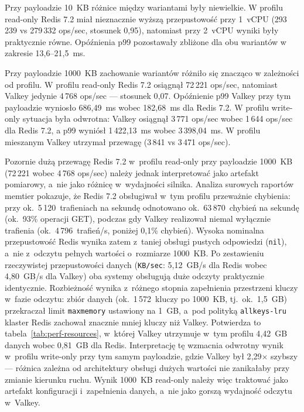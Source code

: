 Przy payloadzie 10~KB różnice między wariantami były niewielkie. W profilu read-only Redis 7.2 miał nieznacznie wyższą przepustowość przy 1~vCPU (293\,239 vs 279\,332 ops/sec, stosunek 0{,}95), natomiast przy 2~vCPU wyniki były praktycznie równe. Opóźnienia p99 pozostawały zbliżone dla obu wariantów w zakresie 13{,}6--21{,}5~ms.

Przy payloadzie 1000~KB zachowanie wariantów różniło się znacząco w zależności od profilu. W profilu read-only Redis 7.2 osiągnął 72\,221 ops/sec, natomiast Valkey jedynie 4\,768 ops/sec --- stosunek 0{,}07. Opóźnienie p99 Valkey przy tym payloadzie wyniosło 686{,}49~ms wobec 182{,}68~ms dla Redis 7.2. W profilu write-only sytuacja była odwrotna: Valkey osiągnął 3\,771 ops/sec wobec 1\,644 ops/sec dla Redis 7.2, a p99 wyniósł 1\,422{,}13~ms wobec 3\,398{,}04~ms. W profilu mieszanym Valkey utrzymał przewagę (3\,841 vs 3\,471 ops/sec).

Pozornie dużą przewagę Redis 7.2 w~profilu read-only przy payloadzie 1000~KB (72\,221 wobec 4\,768 ops/sec) należy jednak interpretować jako artefakt pomiarowy, a~nie jako różnicę w~wydajności silnika. Analiza surowych raportów memtier pokazuje, że Redis 7.2 obsługiwał w~tym profilu przeważnie chybienia: przy ok.\ 5\,120~trafieniach na sekundę odnotowano ok.\ 63\,870~chybień na sekundę (ok.\ 93\% operacji GET), podczas gdy Valkey realizował niemal wyłącznie trafienia (ok.\ 4\,796~trafień/s, poniżej 0{,}1\% chybień). Wysoka nominalna przepustowość Redis wynika zatem z~taniej obsługi pustych odpowiedzi (\texttt{nil}), a~nie z~odczytu pełnych wartości o~rozmiarze 1000~KB. Po zestawieniu rzeczywistej przepustowości danych (\texttt{KB/sec}: 5{,}12~GB/s dla Redis wobec 4{,}80~GB/s dla Valkey) oba systemy obsługują duże odczyty praktycznie identycznie. Rozbieżność wynika z~różnego stopnia zapełnienia przestrzeni kluczy w~fazie odczytu: zbiór danych (ok.\ 1\,572~kluczy po 1000~KB, tj.\ ok.\ 1{,}5~GB) przekraczał limit \texttt{maxmemory} ustawiony na 1~GB, a~pod polityką \texttt{allkeys-lru} klaster Redis zachował znacznie mniej kluczy niż Valkey. Potwierdza to tabela~\ref{tab:perf-resources}, w~której Valkey utrzymuje w~tym profilu 4{,}42~GB danych wobec 0{,}81~GB dla Redis. Interpretację tę wzmacnia odwrotny wynik w~profilu write-only przy tym samym payloadzie, gdzie Valkey był 2{,}29$\times$ szybszy --- różnica zależna od architektury obsługi dużych wartości nie zanikałaby przy zmianie kierunku ruchu. Wynik 1000~KB read-only należy więc traktować jako artefakt konfiguracji i~zapełnienia danych, a~nie jako gorszą wydajność odczytu w~Valkey.

